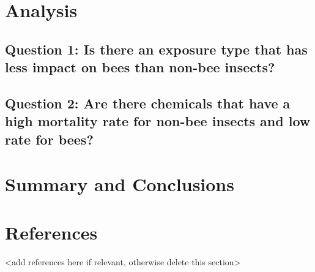\documentclass[
  12pt,
]{article}
\begin{document}
\newpage

\hypertarget{analysis}{%
\section{Analysis}\label{analysis}}

\hypertarget{question-1-is-there-an-exposure-type-that-has-less-impact-on-bees-than-non-bee-insects}{%
\subsection{Question 1: Is there an exposure type that has less impact
on bees than non-bee
insects?}\label{question-1-is-there-an-exposure-type-that-has-less-impact-on-bees-than-non-bee-insects}}

\hypertarget{question-2-are-there-chemicals-that-have-a-high-mortality-rate-for-non-bee-insects-and-low-rate-for-bees}{%
\subsection{Question 2: Are there chemicals that have a high mortality
rate for non-bee insects and low rate for
bees?}\label{question-2-are-there-chemicals-that-have-a-high-mortality-rate-for-non-bee-insects-and-low-rate-for-bees}}

\newpage

\hypertarget{summary-and-conclusions}{%
\section{Summary and Conclusions}\label{summary-and-conclusions}}

\newpage

\hypertarget{references}{%
\section{References}\label{references}}

\textless add references here if relevant, otherwise delete this
section\textgreater{}
\end{document}
